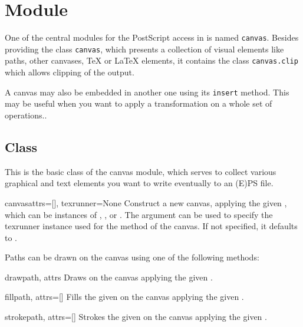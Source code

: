 \section{Module }
\label{canvas}

One of the central modules for the PostScript access in \PyX{} is
named \verb|canvas|. Besides providing the class \verb|canvas|, which
presents a collection of visual elements like paths, other canvases,
\TeX{} or \LaTeX{} elements, it contains the class
\texttt{canvas.clip} which allows clipping of the output.

A canvas may also be embedded in another one using its \texttt{insert}
method. This may be useful when you want to apply a transformation on
a whole set of operations..


\subsection{Class }

This is the basic class of the canvas module, which serves to collect
various graphical and text elements you want to write eventually to an
(E)PS file.

\begin{classdesc}{canvas}{attrs=[], texrunner=None}
  Construct a new canvas, applying the given , which can be
  instances of , ,
   or .  The
   argument can be used to specify the texrunner
  instance used for the  method of the canvas.  If not
  specified, it defaults to .
\end{classdesc}


Paths can be drawn on the canvas using one of the following methods:

\begin{methoddesc}{draw}{path, attrs}
  Draws  on the canvas applying the given .
\end{methoddesc}

\begin{methoddesc}{fill}{path, attrs=[]}
  Fills the given  on the canvas applying the given
  . 
\end{methoddesc}

\begin{methoddesc}{stroke}{path, attrs=[]}
  Strokes the given  on the canvas applying the given
  .
\end{methoddesc}

